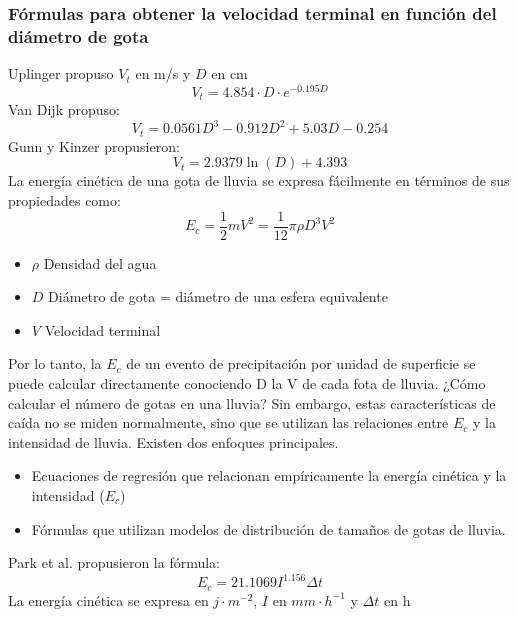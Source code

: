     \subsubsection{Fórmulas para obtener la velocidad terminal en función del diámetro de gota}
    Uplinger propuso $V_t$ en m/s y $D$ en cm
    \begin{equation}
        V_t = 4.854 \cdot D \cdot e^{ -0.195D}
    \end{equation}
    Van Dijk propuso:
    \begin{equation}
        V_t = 0.0561D^3 - 0.912D^2 +5.03D- 0.254
    \end{equation}
    Gunn y Kinzer propusieron:
    \begin{equation}
        V_t = 2.9379\ln{(D)} + 4.393
    \end{equation}
    La energía cinética de una gota de lluvia se expresa fácilmente en términos de sus propiedades como:
    \begin{equation}
        E_c = \frac{1}{2}mV^2 = \frac{1}{12}\pi\rho D^3V^2
    \end{equation}
    \begin{notation}
        \begin{itemize}
            \item $\rho$ Densidad del agua
            \item $D$ Diámetro de gota = diámetro de una esfera equivalente
            \item $V$ Velocidad terminal
        \end{itemize}
    \end{notation}
    Por lo tanto, la $E_c$ de un evento de precipitación por unidad de superficie se puede calcular directamente conociendo D la V de cada fota de lluvia. ¿Cómo calcular el número de gotas en una lluvia?
    Sin embargo, estas características de caída no se miden normalmente, sino que se utilizan las relaciones entre $E_c$ y la intensidad de lluvia. Existen dos enfoques principales.
    \begin{itemize}
        \item Ecuaciones de regresión que relacionan empíricamente la energía cinética y la intensidad ($E_c$)
        \item Fórmulas que utilizan modelos de distribución de tamaños de gotas de lluvia.
    \end{itemize}
    Park et al. propusieron la fórmula:
    \begin{equation}
        E_c = 21.1069I^{1.156}\Delta t
    \end{equation}
    La energía cinética se expresa en $j\cdot m^{-2}$, $I$ en $mm\cdot h^{-1}$ y $\Delta t$ en h
    
